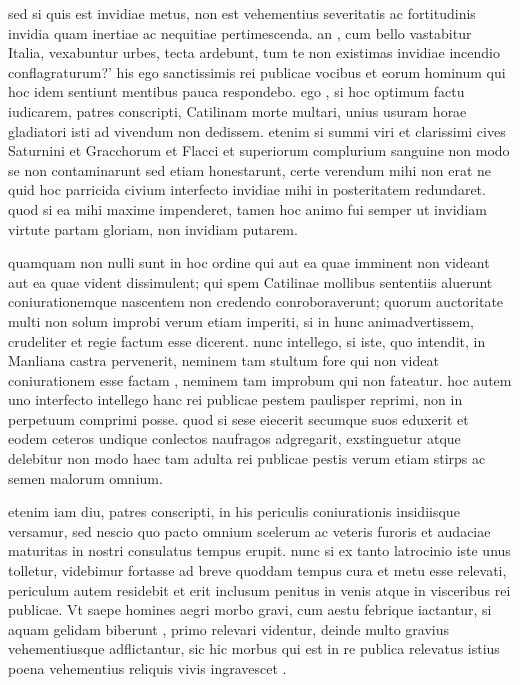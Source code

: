  sed si quis est invidiae metus, non est vehementius severitatis ac fortitudinis invidia quam inertiae ac nequitiae pertimescenda. an , cum bello vastabitur Italia, vexabuntur urbes, tecta ardebunt, tum te non existimas invidiae incendio conflagraturum?' his ego sanctissimis rei publicae vocibus et eorum hominum qui hoc idem sentiunt mentibus pauca respondebo. ego , si hoc optimum factu iudicarem, patres conscripti, Catilinam morte multari, unius usuram horae gladiatori isti ad vivendum non dedissem. etenim si summi viri et clarissimi cives Saturnini et Gracchorum et Flacci et superiorum complurium sanguine non modo se non contaminarunt sed etiam honestarunt, certe verendum mihi non erat ne quid hoc parricida civium interfecto invidiae mihi in posteritatem redundaret. quod si ea mihi maxime impenderet, tamen hoc animo fui semper ut invidiam virtute partam gloriam, non invidiam putarem.

 quamquam non nulli sunt in hoc ordine qui aut ea quae imminent non videant aut ea quae vident dissimulent; qui spem Catilinae mollibus sententiis aluerunt coniurationemque nascentem non credendo conroboraverunt; quorum auctoritate multi non solum improbi verum etiam imperiti, si in hunc animadvertissem, crudeliter et regie factum esse dicerent. nunc intellego, si iste, quo intendit, in Manliana castra pervenerit, neminem tam stultum fore qui non videat coniurationem esse factam , neminem tam improbum qui non fateatur. hoc autem uno interfecto intellego hanc rei publicae pestem paulisper reprimi, non in perpetuum comprimi posse. quod si sese eiecerit secumque suos eduxerit et eodem ceteros undique conlectos naufragos adgregarit, exstinguetur atque delebitur non modo haec tam adulta rei publicae pestis verum etiam stirps ac semen malorum omnium.

 etenim iam diu, patres conscripti, in his periculis coniurationis insidiisque versamur, sed nescio quo pacto omnium scelerum ac veteris furoris et audaciae maturitas in nostri consulatus tempus erupit. nunc si ex tanto latrocinio iste unus tolletur, videbimur fortasse ad breve quoddam tempus cura et metu esse relevati, periculum autem residebit et erit inclusum penitus in venis atque in visceribus rei publicae. Vt saepe homines aegri morbo gravi, cum aestu febrique iactantur, si aquam gelidam biberunt , primo relevari videntur, deinde multo gravius vehementiusque adflictantur, sic hic morbus qui est in re publica relevatus istius poena vehementius reliquis vivis ingravescet .

